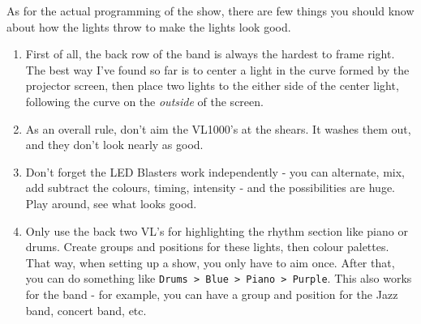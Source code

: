 \documentclass[11pt,a4paper]{book}
\begin{document}
\begin{enumerate}
As for the actual programming of the show, there are few things you should know about how the lights throw to make the lights look good. 

\begin{enumerate}
\item First of all, the back row of the band is always the hardest to frame right. The best way I've found so far is to center a light in the curve formed by the projector screen, then place two lights to the either side of the center light, following the curve on the \textit{outside} of the screen.
\item As an overall rule, don't aim the VL1000's at the shears. It washes them out, and they don't look nearly as good.
\item Don't forget the LED Blasters work independently - you can alternate, mix, add subtract the colours, timing, intensity - and the possibilities are huge. Play around, see what looks good. 
\item Only use the back two VL's for highlighting the rhythm section like piano or drums. Create groups and positions for these lights, then colour palettes. That way, when setting up a show, you only have to aim once. After that, you can do something like \texttt{Drums > Blue > Piano > Purple}. This also works for the band - for example, you can have a group and position for the Jazz band, concert band, etc.
\end{enumerate}

\end{enumerate}
\end{document}

